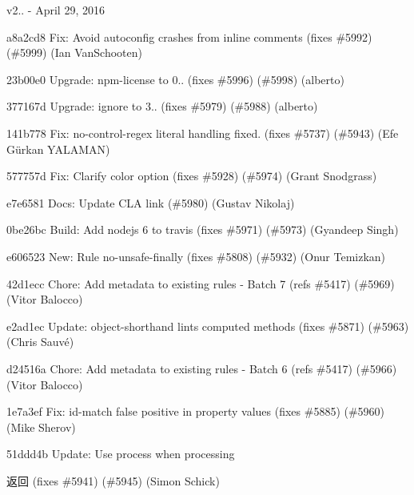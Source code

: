 v2.. -\/ April 29, 2016


\begin{DoxyItemize}
\item a8a2cd8 Fix\+: Avoid autoconfig crashes from inline comments (fixes \#5992) (\#5999) (Ian Van\+Schooten)
\item 23b00e0 Upgrade\+: npm-\/license to 0.. (fixes \#5996) (\#5998) (alberto)
\item 377167d Upgrade\+: ignore to 3.. (fixes \#5979) (\#5988) (alberto)
\item 141b778 Fix\+: no-\/control-\/regex literal handling fixed. (fixes \#5737) (\#5943) (Efe Gürkan Y\+A\+L\+A\+M\+AN)
\item 577757d Fix\+: Clarify color option (fixes \#5928) (\#5974) (Grant Snodgrass)
\item e7e6581 Docs\+: Update C\+LA link (\#5980) (Gustav Nikolaj)
\item 0be26bc Build\+: Add nodejs 6 to travis (fixes \#5971) (\#5973) (Gyandeep Singh)
\item e606523 New\+: Rule {\ttfamily no-\/unsafe-\/finally} (fixes \#5808) (\#5932) (Onur Temizkan)
\item 42d1ecc Chore\+: Add metadata to existing rules -\/ Batch 7 (refs \#5417) (\#5969) (Vitor Balocco)
\item e2ad1ec Update\+: object-\/shorthand lints computed methods (fixes \#5871) (\#5963) (Chris Sauvé)
\item d24516a Chore\+: Add metadata to existing rules -\/ Batch 6 (refs \#5417) (\#5966) (Vitor Balocco)
\item 1e7a3ef Fix\+: {\ttfamily id-\/match} false positive in property values (fixes \#5885) (\#5960) (Mike Sherov)
\item 51ddd4b Update\+: Use process  when processing \begin{DoxyReturn}{返回}
(fixes \#5941) (\#5945) (Simon Schick)
\end{DoxyReturn}


\end{DoxyItemize}
